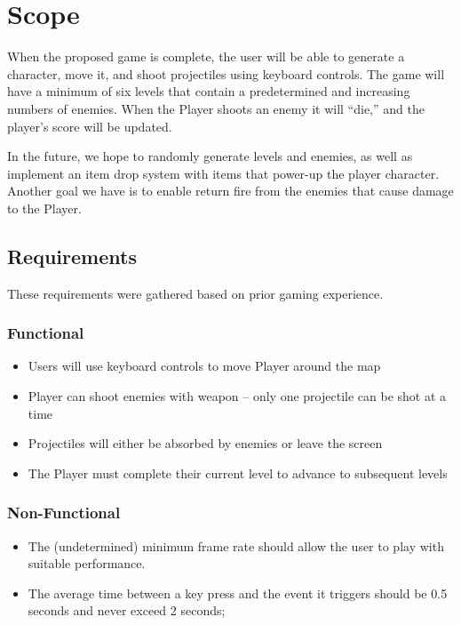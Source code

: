 \documentclass[10pt,conference,onecolumn,compsoc]{IEEEtran}
\begin{document}
\section{Scope}
	
	When the proposed game is complete, the user will be able to generate a
character, move it, and shoot projectiles using keyboard controls. The game will have a minimum of six levels that contain a predetermined and increasing numbers of enemies. When the Player shoots an enemy it will ``die,'' and the player's score will be updated.
	
	In the future, we hope to randomly generate levels and enemies, as well as implement an 
item drop system with items that power-up the player character. Another goal we have is to enable return fire from the enemies that cause damage to the Player. 

\subsection{Requirements}
These requirements were gathered based on prior gaming experience.

\subsubsection{Functional}
\begin{itemize}
\item Users will use keyboard controls to move Player around the map
\item Player can shoot enemies with weapon -- only one projectile can be shot at a time
\item Projectiles will either be absorbed by enemies or leave the screen
\item The Player must complete their current  level to advance to subsequent levels
\end{itemize}

\subsubsection{Non-Functional}
\begin{itemize}
\item The (undetermined) minimum frame rate should allow the user to play with suitable performance.
\item The average time between a key press and the event it triggers should be 0.5 seconds and never exceed 2 seconds;
\end{itemize}
\end{document}
